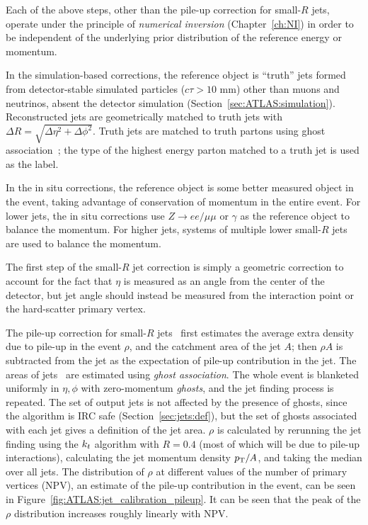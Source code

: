 Each of the above steps, other than the pile-up correction for small-$R$ jets, operate under the principle of \textit{numerical inversion} (Chapter~\ref{ch:NI}) in order to be independent of the underlying prior distribution of the reference energy or momentum.

In the simulation-based corrections, the reference object is ``truth'' jets formed from detector-stable simulated particles ($c\tau > 10$ mm) other than muons and neutrinos, absent the detector simulation (Section~\ref{sec:ATLAS:simulation}).
Reconstructed jets are geometrically matched to truth jets with $\Delta R = \sqrt{\Delta\eta^2+\Delta\phi^2}$.
Truth jets are matched to truth partons using ghost association~\cite{Cacciari:2008gn}; the type of the highest energy parton matched to a truth jet is used as the label.

In the in situ corrections, the reference object is some better measured object in the event, taking advantage of conservation of momentum in the entire event.
For lower \pt{} jets, the in situ corrections use $Z\rightarrow ee/\mu\mu$ or $\gamma$ as the reference object to balance the momentum.
For higher \pt{} jets, systems of multiple lower \pt{} small-$R$ jets are used to balance the momentum.

The first step of the small-$R$ jet correction is simply a geometric correction to account for the fact that $\eta$ is measured as an angle from the center of the detector, but jet angle should instead be measured from the interaction point or the hard-scatter primary vertex.

The pile-up correction for small-$R$ jets~\cite{Cacciari:2007fd} first estimates the average extra \pt{} density due to pile-up in the event $\rho$, and the catchment area of the jet $A$; then $\rho A$ is subtracted from the jet \pt{} as the expectation of pile-up contribution in the jet.
The areas of jets~\cite{Cacciari:2008gn} are estimated using \textit{ghost association}.
The whole event is blanketed uniformly in $\eta,\phi$ with zero-momentum \textit{ghosts}, and the jet finding process is repeated.
The set of output jets is not affected by the presence of ghosts, since the algorithm is IRC safe (Section~\ref{sec:jets:def}), but the set of ghosts associated with each jet gives a definition of the jet area.
$\rho$ is calculated by rerunning the jet finding using the $k_{t}$ algorithm with $R=0.4$ (most of which will be due to pile-up interactions), calculating the jet momentum density $p_{\text{T}}/A$, and taking the median over all jets.
The distribution of $\rho$ at different values of the number of primary vertices (NPV), an estimate of the pile-up contribution in the event, can be seen in Figure~\ref{fig:ATLAS:jet_calibration_pileup}.
It can be seen that the peak of the $\rho$ distribution increases roughly linearly with NPV.


